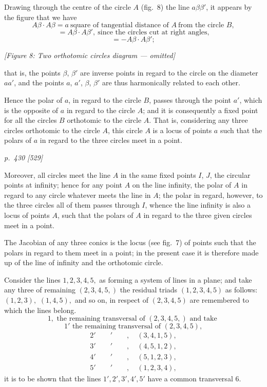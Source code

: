 \documentclass[11pt,a4paper]{article}
\theoremstyle{plain}
\theoremstyle{definition}
\begin{document}
Drawing through the centre of the circle $A$ (fig.~8) the line $a\beta\beta'$, it appears by
the figure that we have
\[
A\beta\cdot A\beta = a\ \text{square of tangential distance of }A\ \text{from the circle }B,
\]
\[
= A\beta\cdot A\beta',\ \text{since the circles cut at right angles,}
\]
\[
= -A\beta\cdot A\beta';
\]

\begin{center}
\textit{[Figure 8: Two orthotomic circles diagram --- omitted]}
\end{center}

\noindent
that is, the points $\beta$, $\beta'$ are inverse points in regard to the circle on the diameter $aa'$,
and the points $a$, $a'$, $\beta$, $\beta'$ are thus harmonically related to each other.

Hence the polar of $a$, in regard to the circle $B$, passes through the point $a'$,
which is the opposite of $a$ in regard to the circle $A$; and it is consequently a fixed point for
all the circles $B$ orthotomic to the circle $A$. That is, considering any three circles
orthotomic to the circle $A$, this circle $A$ is a locus of points $a$ such that the polars
of $a$ in regard to the three circles meet in a point.

\clearpage

\bigskip
\textit{p.~430 [529]}
\smallskip

Moreover, all circles meet the line $A$ in the same fixed points $I$, $J$, the circular
points at infinity; hence for any point $A$ on the line infinity, the polar of $A$ in regard
to any circle whatever meets the line in $A$; the polar in regard, however, to the three
circles all of them passes through $I$, whence the line infinity is also a locus of points $A$,
such that the polars of $A$ in regard to the three given circles meet in a point.

The Jacobian of any three conics is the locus (see fig.~7) of points such that the
polars in regard to them meet in a point; in the present case it is therefore made up of
the line of infinity and the orthotomic circle.

Consider the lines $1, 2, 3, 4, 5,$ as forming a system of lines in a plane;
and take any three of remaining $(2, 3, 4, 5,)$ the residual triads $(1,2,3,4,5)$ as follows: $(1, 2,3),$ $(1,4,5),$ and so on, in respect of $(2, 3, 4, 5)$ are remembered to which the lines belong.
\[
1, \text{ the remaining transversal of } (2,3,4,5,) \text{ and take }
\]
\[
1' \text{ the remaining transversal of } (2,3,4,5),
\]
\[
\begin{array}{l}
2'\quad\quad \prime\quad\quad ,\quad (3,4,1,5),\\
3'\quad\quad \prime\quad\quad ,\quad (4,5,1,2),\\
4'\quad\quad \prime\quad\quad ,\quad (5,1,2,3),\\
5'\quad\quad \prime\quad\quad ,\quad (1,2,3,4),
\end{array}
\]
it is to be shown that the lines $1', 2', 3', 4', 5'$ have a common transversal $6$.
\end{document}

